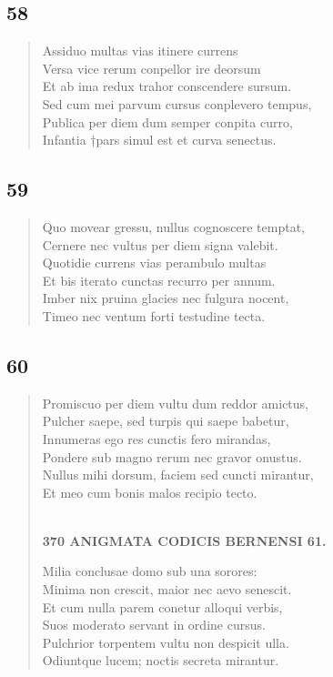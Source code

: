 \documentclass[11pt, a4paper]{report}
\begin{document}
            \subsection*{58}
      \begin{verse}
      Assiduo multas vias itinere currens \\ Versa vice rerum conpellor ire deorsum \\ Et ab ima redux trahor conscendere sursum. \\ Sed cum mei parvum cursus conplevero tempus, \\ Publica per diem dum semper conpita curro, \\ Infantia †pars simul est et curva senectus. \\ 
      \end{verse}
  
            \subsection*{59}
      \begin{verse}
      Quo movear gressu, nullus cognoscere temptat, \\ Cernere nec vultus per diem signa valebit. \\ Quotidie currens vias perambulo multas \\ Et bis iterato cunctas recurro per annum. \\ Imber nix pruina glacies nec fulgura nocent, \\ Timeo nec ventum forti testudine tecta. \\ 
      \end{verse}
  
            \subsection*{60}
      \begin{verse}
      Promiscuo per diem vultu dum reddor amictus, \\ Pulcher saepe, sed turpis qui saepe babetur, \\ Innumeras ego res cunctis fero mirandas, \\ Pondere sub magno rerum nec gravor onustus. \\ Nullus mihi dorsum, faciem sed cuncti mirantur, \\ Et meo cum bonis malos recipio tecto. \\ 
        ﻿\pagebreak 
    \begin{center} \textbf{370 ANIGMATA CODICIS BERNENSI 61.} \end{center}Milia conclusae domo sub una sorores: \\ Minima non crescit, maior nec aevo senescit. \\ Et cum nulla parem conetur alloqui verbis, \\ Suos moderato servant in ordine cursus. \\ Pulchrior torpentem vultu non despicit ulla. \\ Odiuntque lucem; noctis secreta mirantur. \\ 
      \end{verse}
  
\end{document}

